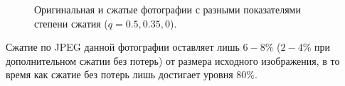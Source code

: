 \documentclass[12pt,a4paper]{article}
\begin{document}
\begin{figure}[!htb]
                \hspace{8pt}%
                \hspace{8pt}%
                \caption[]{Оригинальная и сжатые фотографии с разными показателями степени сжатия ($q=0.5,0.35,0$).}%
                \label{fig:1}%
            \end{figure}

            Сжатие по JPEG данной фотографии оставляет лишь $6-8$\% ($2-4$\% при дополнительном сжатии без потерь) от размера исходного изображения, в то время как сжатие без потерь лишь достигает уровня $80$\%.
\end{document}
